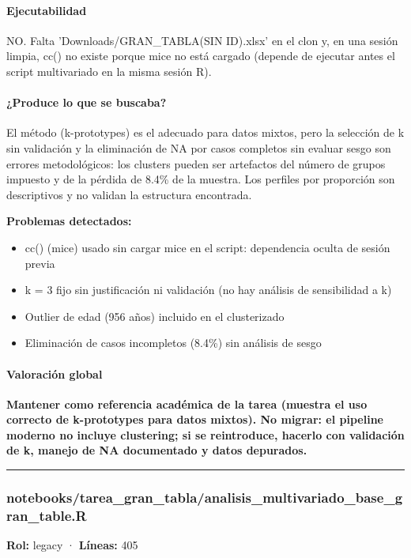 \paragraph{Ejecutabilidad}
NO. Falta 'Downloads/GRAN\_TABLA(SIN ID).xlsx' en el clon y, en una sesión limpia, cc() no existe porque mice no está cargado (depende de ejecutar antes el script multivariado en la misma sesión R).

\paragraph{¿Produce lo que se buscaba?}
El método (k-prototypes) es el adecuado para datos mixtos, pero la selección de k sin validación y la eliminación de NA por casos completos sin evaluar sesgo son errores metodológicos: los clusters pueden ser artefactos del número de grupos impuesto y de la pérdida de 8.4\% de la muestra. Los perfiles por proporción son descriptivos y no validan la estructura encontrada.

\begin{tcolorbox}[riesgo]
\textbf{Problemas detectados:}
\begin{itemize}
  \item cc() (mice) usado sin cargar mice en el script: dependencia oculta de sesión previa
  \item k = 3 fijo sin justificación ni validación (no hay análisis de sensibilidad a k)
  \item Outlier de edad (956 años) incluido en el clusterizado
  \item Eliminación de casos incompletos (8.4\%) sin análisis de sesgo
\end{itemize}
\end{tcolorbox}

\paragraph{Valoración global}
\textbf{Mantener como referencia académica de la tarea (muestra el uso correcto de k-prototypes para datos mixtos). No migrar: el pipeline moderno no incluye clustering; si se reintroduce, hacerlo con validación de k, manejo de NA documentado y datos depurados.}

\medskip
\hrule

\subsubsection{notebooks/tarea\_gran\_tabla/analisis\_multivariado\_base\_gran\_table.R}
\textbf{Rol:} legacy · \textbf{Líneas:} 405

